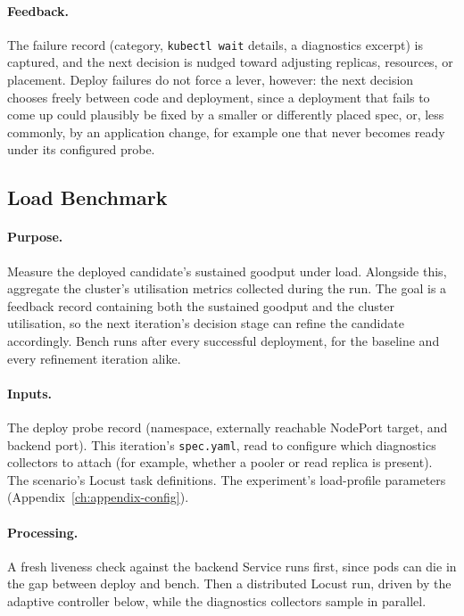 \paragraph{Feedback.}
The failure record (category, \texttt{kubectl wait} details, a diagnostics
excerpt) is captured, and the next decision is nudged toward adjusting
replicas, resources, or placement. Deploy failures do not force a lever,
however: the next decision chooses freely between code and deployment,
since a deployment that fails to come up could plausibly be fixed by a
smaller or differently placed spec, or, less commonly, by an application
change, for example one that never becomes ready under its configured
probe.

\FloatBarrier

\subsection{Load Benchmark}
\label{sec:methods-bench}

\paragraph{Purpose.}
Measure the deployed candidate's sustained goodput under load.
Alongside this, aggregate the cluster's utilisation metrics collected
during the run. The goal is a feedback record containing both the
sustained goodput and the cluster utilisation, so the next iteration's
decision stage can refine the candidate accordingly. Bench runs after
every successful deployment, for the baseline and every refinement
iteration alike.

\paragraph{Inputs.}
The deploy probe record (namespace, externally reachable NodePort target, and
backend port). This iteration's
\texttt{spec.yaml}, read to configure which diagnostics collectors to
attach (for example, whether a pooler or read replica is present). The
scenario's Locust task definitions. The experiment's load-profile parameters
(Appendix~\ref{ch:appendix-config}).

\paragraph{Processing.}
A fresh liveness check against the backend Service runs first, since pods
can die in the gap between deploy and bench. Then a distributed Locust
run, driven by the adaptive controller below, while the diagnostics
collectors sample in parallel.

